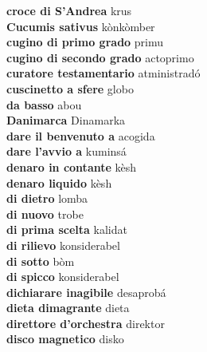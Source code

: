 \textbf{ croce di S’Andrea  } krus \\
\textbf{ Cucumis sativus  } kònkòmber \\
\textbf{ cugino di primo grado  } primu \\
\textbf{ cugino di secondo grado  } actoprimo \\
\textbf{ curatore testamentario  } atministradó \\
\textbf{ cuscinetto a sfere  } globo \\
\textbf{ da basso  } abou \\
\textbf{ Danimarca  } Dinamarka \\
\textbf{ dare il benvenuto a  } acogida \\
\textbf{ dare l’avvio a  } kuminsá \\
\textbf{ denaro in contante  } kèsh \\
\textbf{ denaro liquido  } kèsh \\
\textbf{ di dietro  } lomba \\
\textbf{ di nuovo  } trobe \\
\textbf{ di prima scelta  } kalidat \\
\textbf{ di rilievo  } konsiderabel \\
\textbf{ di sotto  } bòm \\
\textbf{ di spicco  } konsiderabel \\
\textbf{ dichiarare inagibile  } desaprobá \\
\textbf{ dieta dimagrante  } dieta \\
\textbf{ direttore d’orchestra  } direktor \\
\textbf{ disco magnetico  } disko \\
